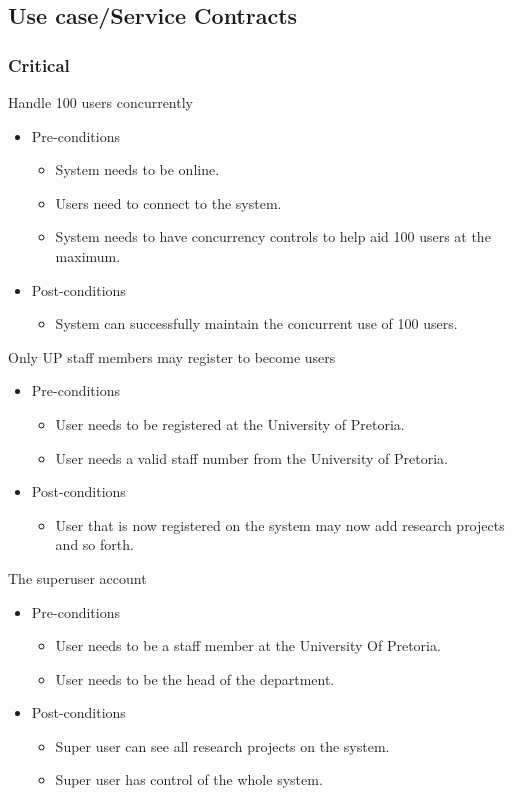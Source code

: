 \documentclass[a4paper,12pt]{report}
\begin{document}
	
\subsection{Use case/Service Contracts}
\subsubsection{Critical}
	Handle 100 users concurrently
	\begin{itemize}
		\item Pre-conditions
			\begin{itemize}
				\item System needs to be online.
				\item Users need to connect to the system.
				\item System needs to have concurrency controls to help aid 100 users at the maximum.
			\end{itemize}
		\item Post-conditions
			\begin{itemize}
				\item System can successfully maintain the concurrent use of 100 users.
			\end{itemize}
	\end{itemize}

	Only UP staff members may register to become users
	\begin{itemize}
		\item Pre-conditions
			\begin{itemize}
				\item User needs to be registered at the University of Pretoria.
				\item User needs a valid staff number from the University of Pretoria.
			\end{itemize}
		\item Post-conditions
			\begin{itemize}
				\item User that is now registered on the system may now add research projects and so forth.
			\end{itemize}
	\end{itemize}

	The superuser account
	\begin{itemize}
		\item Pre-conditions
			\begin{itemize}
				\item User needs to be a staff member at the University Of Pretoria.
				\item User needs to be the head of the department.
			\end{itemize}
		\item Post-conditions
			\begin{itemize}
				\item Super user can see all research projects on the system.
				\item Super user has control of the whole system.
			\end{itemize}
	\end{itemize}
\end{document}

